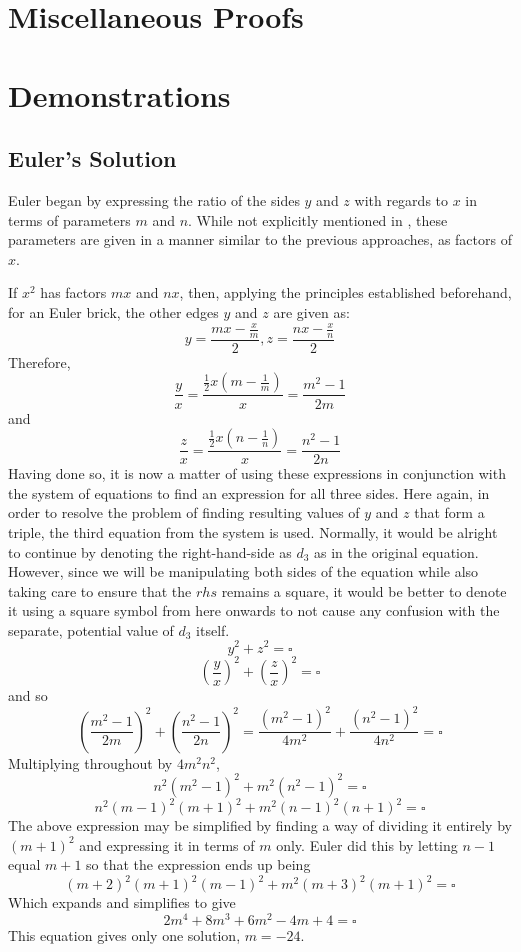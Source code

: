 \documentclass[11pt]{article}
\begin{document}
\newpage
\begin{appendices}
	
\section{Miscellaneous Proofs}
\label{appendix:misc}

\section{Demonstrations}
\label{appendix:par}
\subsection{Euler's Solution}
Euler began by expressing the ratio of the sides $y$ and $z$ with regards to $x$ in terms of parameters $m$ and $n$. While not explicitly mentioned in \cite{euler}, these parameters are given in a manner similar to the previous approaches, as factors of $x$.

If $x^2$ has factors $mx$ and $nx$, then, applying the principles established beforehand, for an Euler brick, the other edges $y$ and $z$ are given as:
$$y=\frac{mx-\frac{x}{m}}{2}, z=\frac{nx-\frac{x}{n}}{2}$$
Therefore, 
$$\frac{y}{x}=\frac{\frac{1}{2}x(m-\frac{1}{m})}{x}=\frac{m^2-1}{2m}$$
and 
$$\frac{z}{x}=\frac{\frac{1}{2}x(n-\frac{1}{n})}{x}=\frac{n^2-1}{2n}$$
Having done so, it is now a matter of using these expressions in conjunction with the system of equations to find an expression for all three sides. Here again, in order to resolve the problem of finding resulting values of $y$ and $z$ that form a triple, the third equation from the system is used. Normally, it would be alright to continue by denoting the right-hand-side as $d_3$ as in the original equation. However, since we will be manipulating both sides of the equation while also taking care to ensure that the $rhs$ remains a square, it would be better to denote it using a square symbol from here onwards to not cause any confusion with the separate, potential value of $d_3$ itself.
$$y^2+z^2=\square$$
$$\left(\frac{y}{x}\right)^2+\left(\frac{z}{x}\right)^2=\square$$
and so
$$\left(\frac{m^2-1}{2m}\right)^2+\left(\frac{n^2-1}{2n}\right)^2=\frac{(m^2-1)^2}{4m^2}+\frac{(n^2-1)^2}{4n^2}=\square$$
Multiplying throughout by $4m^2n^2$,
$$n^2(m^2-1)^2+m^2(n^2-1)^2=\square$$
$$n^2(m-1)^2(m+1)^2+m^2(n-1)^2(n+1)^2=\square$$
The above expression may be simplified by finding a way of dividing it entirely by $(m+1)^2$ and expressing it in terms of $m$ only. Euler did this by letting $n-1$ equal $m+1$ so that the expression ends up being
$$(m+2)^2(m+1)^2(m-1)^2+m^2(m+3)^2(m+1)^2=\square$$
Which expands and simplifies to give
$$2m^4+8m^3+6m^2-4m+4=\square$$
This equation gives only one solution, $m=-24$.


\end{appendices}
\end{document}
